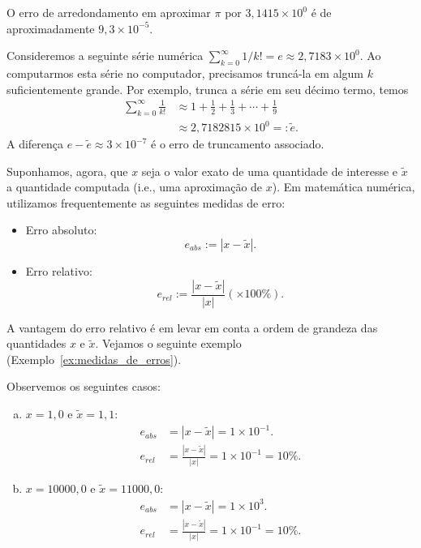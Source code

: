 \begin{ex}\label{ex:erro_de_arredondamento}
  O erro de arredondamento em aproximar $\pi$ por $3,1415\times 10^0$ é de aproximadamente $9,3\times 10^{-5}$.
\end{ex}

\begin{ex}\label{ex:erro_de_truncamento}
  Consideremos a seguinte série numérica $\sum_{k=0}^\infty 1/k! = e \approx 2,7183\times 10^0$. Ao computarmos esta série no computador, precisamos truncá-la em algum $k$ suficientemente grande. Por exemplo, trunca a série em seu décimo termo, temos
  \begin{align}
    \sum_{k=0}^\infty \frac{1}{k!} &\approx 1 + \frac{1}{2} + \frac{1}{3} + \cdots + \frac{1}{9} \\
    &\approx 2,7182815\times 10^0 =: \tilde{e}.
  \end{align}
A diferença $e - \tilde{e} \approx 3\times 10^{-7}$ é o erro de truncamento associado.
\end{ex}

Suponhamos, agora, que $x$ seja o valor exato de uma quantidade de interesse e $\tilde{x}$ a quantidade computada (i.e., uma aproximação de $x$). Em matemática numérica, utilizamos frequentemente as seguintes medidas de erro:
\begin{itemize}
  \item Erro absoluto:
    \begin{equation}
      e_{abs} := |x - \tilde{x}|.
    \end{equation}
  \item Erro relativo:
    \begin{equation}
      e_{rel} := \frac{|x - \tilde{x}|}{|x|}\left(\times 100\%\right).
    \end{equation}
\end{itemize}

A vantagem do erro relativo é em levar em conta a ordem de grandeza das quantidades $x$ e $\tilde{x}$. Vejamos o seguinte exemplo (Exemplo~\ref{ex:medidas_de_erros}).

\begin{ex}\label{ex:medidas_de_erros}
  Observemos os seguintes casos:
  \begin{enumerate}[a)]
  \item $x=1,0$ e $\tilde{x} = 1,1$:
    \begin{align}
      e_{abs} &= |x - \tilde{x}| = 1\times 10^{-1}.\\
      e_{rel} &= \frac{|x - \tilde{x}|}{|x|} = 1\times 10^{-1} = 10\%.
    \end{align}
  \item $x=10000,0$ e $\tilde{x} = 11000,0$:
    \begin{align}
      e_{abs} &= |x - \tilde{x}| = 1\times 10^3.\\
      e_{rel} &= \frac{|x - \tilde{x}|}{|x|} = 1\times 10^{-1} = 10\%.
    \end{align}
  \end{enumerate}
\end{ex}


